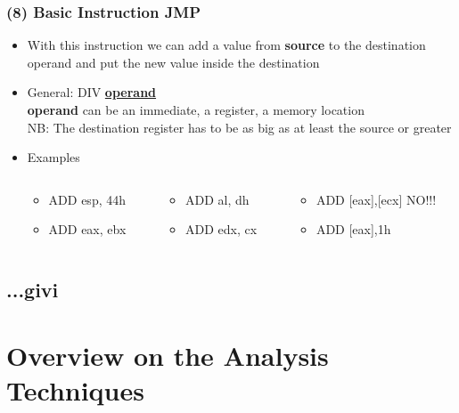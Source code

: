 \documentclass[]{beamer}
\begin{document}
		
		\begin{frame}
			\frametitle{(8) Basic Instruction JMP}
			\begin{itemize}
				\item{With this instruction we can add a value from \textbf{source}  to the destination operand and put the new value inside the destination}
				\item{General: DIV \underline{\textbf{operand}}\\
					\textbf{operand} can be an immediate, a register, a memory location\\
					NB: The destination register has to be as big as at least the source or greater} 
				\item{Examples}
					\begin{columns}
						\begin{column}[left]{1.7in}
							\begin{itemize}
								\item{ADD esp, 44h}
								\item{ADD eax, ebx}
							\end{itemize}
						\end{column}
						\begin{column}[center]{1.5in}
							\begin{itemize}
								\item{ADD al, dh}
								\item{ADD edx, cx}
							\end{itemize}
						\end{column}
						\begin{column}[right]{2in}
							\begin{itemize}
								\item{ADD [eax],[ecx] NO!!!}
								\item{ADD [eax],1h}
							\end{itemize}
						\end{column}
					\end{columns}
			\end{itemize}
		\end{frame}
	\subsection{...givi}


\section {Overview on the Analysis Techniques }
\end{document}
